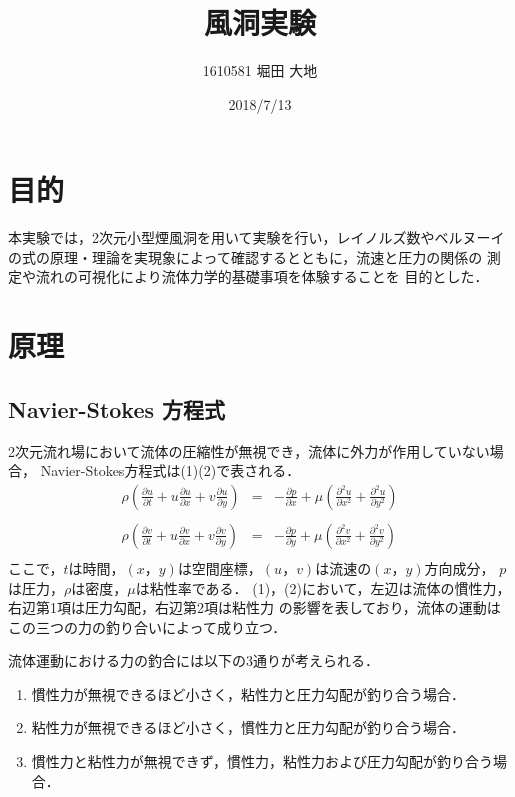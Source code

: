 \documentclass[twocolumn,10pt,a4j]{jsarticle}
\title{\vspace{-2.5cm}風洞実験}
\author{1610581 堀田 大地}
\date{2018/7/13}
\begin{document}
\maketitle{}
\section{目的}
  本実験では，2次元小型煙風洞を用いて実験を行い，レイノルズ数やベルヌーイ
  の式の原理・理論を実現象によって確認するとともに，流速と圧力の関係の
  測定や流れの可視化により流体力学的基礎事項を体験することを
  目的とした．

\section{原理}
  \subsection{Navier-Stokes 方程式}
    2次元流れ場において流体の圧縮性が無視でき，流体に外力が作用していない場合，
    Navier-Stokes方程式は(1)(2)で表される．
      \begin{eqnarray}
        \rho \left( \frac{\partial u}{\partial t} + u\frac{\partial u}{\partial x} + v\frac{\partial u}{\partial y} \right) &=& - \frac{\partial p}{\partial x} + \mu \left( \frac{\partial^2 u}{\partial x^2} + \frac{\partial^2 u}{\partial y^2} \right) \nonumber \\
        \\
        \rho \left( \frac{\partial v}{\partial t} + u\frac{\partial v}{\partial x} + v\frac{\partial v}{\partial y} \right) &=& - \frac{\partial p}{\partial y} + \mu \left( \frac{\partial^2 v}{\partial x^2} + \frac{\partial^2 v}{\partial y^2} \right) \nonumber \\
      \end{eqnarray}
    ここで，$t$は時間，$(x， y)$は空間座標，$(u， v)$は流速の$(x， y)$方向成分，
    $p$は圧力，$\rho$は密度，$\mu$は粘性率である．
    (1)，(2)において，左辺は流体の慣性力，右辺第1項は圧力勾配，右辺第2項は粘性力
    の影響を表しており，流体の運動はこの三つの力の釣り合いによって成り立つ．
    \par 流体運動における力の釣合には以下の3通りが考えられる．
      \begin{enumerate}
        \item 慣性力が無視できるほど小さく，粘性力と圧力勾配が釣り合う場合． \\
        \item 粘性力が無視できるほど小さく，慣性力と圧力勾配が釣り合う場合． \\
        \item 慣性力と粘性力が無視できず，慣性力，粘性力および圧力勾配が釣り合う場合． \\
      \end{enumerate}
\end{document}
